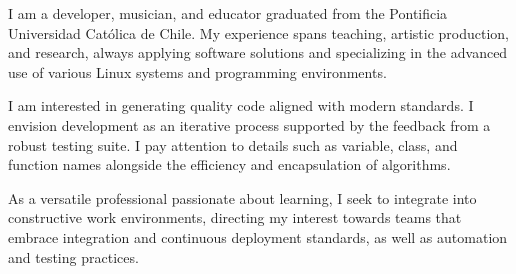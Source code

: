 

\begin{cvparagraph}

    I am a developer, musician, and educator graduated from the Pontificia
    Universidad Católica de Chile. My experience spans teaching, artistic
    production, and research, always applying software solutions and
    specializing in the advanced use of various Linux systems and programming
    environments.

    I am interested in generating quality code aligned with modern standards. I
    envision development as an iterative process supported by the feedback from
    a robust testing suite. I pay attention to details such as variable, class,
    and function names alongside the efficiency and encapsulation of algorithms.

    As a versatile professional passionate about learning, I seek to integrate
    into constructive work environments, directing my interest towards teams
    that embrace integration and continuous deployment standards, as well as
    automation and testing practices.

\end{cvparagraph}

